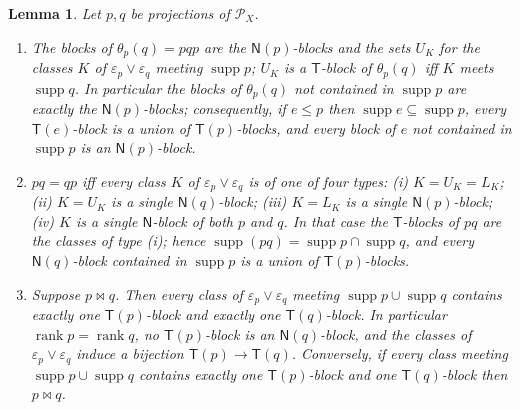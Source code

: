 \documentclass[11pt]{amsart}
\newtheorem{lemma}[theorem]{Lemma}
\theoremstyle{definition}
\renewcommand{\P}{\mathcal{P}}      %
\newcommand{\supp}{\operatorname{supp}}
\newcommand{\T}{\mathsf{T}}
\newcommand{\N}{\mathsf{N}}
\newcommand{\rk}{\operatorname{rank}}
\newcommand{\mt}{\bowtie}      %
\begin{document}
\begin{lemma}\label{lem:PX}
Let $p,q$ be projections of $\P_X$.
\begin{enumerate}[label=\textup{(\alph*)}]
\item The blocks of $\theta_p(q)=pqp$ are the $\N(p)$-blocks and the sets $U_K$ for the classes $K$ of $\varepsilon_p\vee\varepsilon_q$ meeting $\supp p$; $U_K$ is a $\T$-block of $\theta_p(q)$ iff $K$ meets $\supp q$. In particular the blocks of $\theta_p(q)$ not contained in $\supp p$ are exactly the $\N(p)$-blocks; consequently, if $e\le p$ then $\supp e\subseteq\supp p$, every $\T(e)$-block is a union of $\T(p)$-blocks, and every block of $e$ not contained in $\supp p$ is an $\N(p)$-block.
\item $pq=qp$ iff every class $K$ of $\varepsilon_p\vee\varepsilon_q$ is of one of four types: \textup{(i)} $K=U_K=L_K$; \textup{(ii)} $K=U_K$ is a single $\N(q)$-block; \textup{(iii)} $K=L_K$ is a single $\N(p)$-block; \textup{(iv)} $K$ is a single $\N$-block of both $p$ and $q$. In that case the $\T$-blocks of $pq$ are the classes of type \textup{(i)}; hence $\supp(pq)=\supp p\cap\supp q$, and every $\N(q)$-block contained in $\supp p$ is a union of $\T(p)$-blocks.
\item Suppose $p\mt q$. Then every class of $\varepsilon_p\vee\varepsilon_q$ meeting $\supp p\cup\supp q$ contains exactly one $\T(p)$-block and exactly one $\T(q)$-block. In particular $\rk p=\rk q$, no $\T(p)$-block is an $\N(q)$-block, and the classes of $\varepsilon_p\vee\varepsilon_q$ induce a bijection $\T(p)\to\T(q)$. Conversely, if every class meeting $\supp p\cup\supp q$ contains exactly one $\T(p)$-block and one $\T(q)$-block then $p\mt q$.
\end{enumerate}
\end{lemma}
\end{document}
